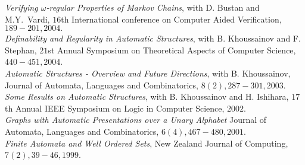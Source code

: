 \documentclass[a4paper]{article}
\begin{document}
{\it Verifying $\omega$-regular Properties of Markov Chains}, with D. Bustan and
M.Y.~Vardi, $16$th International conference on Computer Aided Verification,
$189-201, 2004.$ \\

 
{\it Definability and Regularity in Automatic Structures}, with B. Khoussainov
and F. Stephan, $21$st Annual Symposium on Theoretical Aspects of 
Computer Science, $440-451, 2004$.  \\
 
{\it Automatic Structures - Overview and Future Directions}, with 
B. Khoussainov,
Journal of Automata, Languages and Combinatorics, $8(2), 287-301, 2003$. \\

{\it Some Results on Automatic Structures}, with B. Khoussainov
and H. Ishihara, $17$th Annual IEEE Symposium on Logic in Computer Science,
$2002$. \\

{\it Graphs with Automatic Presentations over a Unary Alphabet}
Journal of Automata, Languages and Combinatorics, $6(4), 467-480, 2001$. \\

{\it Finite Automata and Well Ordered Sets},
New Zealand Journal of Computing, $7(2), 39-46, 1999$. 

%
% 
%
%
%
%
\end{document}
